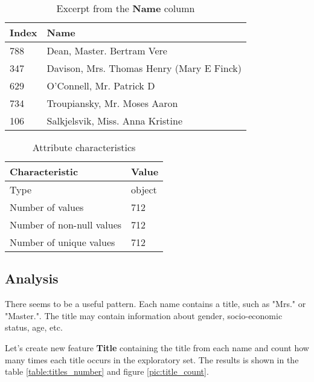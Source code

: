 \begin{table}[!hp]
    \centering
    \caption{Excerpt from the \textbf{Name} column}
    \begin{tabular}{|l|l|}
        \hline
        \textbf{Index} & \textbf{Name}                             \\ \hline
        788            & Dean, Master. Bertram Vere                \\ \hline
        347            & Davison, Mrs. Thomas Henry (Mary E Finck) \\ \hline
        629            & O'Connell, Mr. Patrick D                  \\ \hline
        734            & Troupiansky, Mr. Moses Aaron              \\ \hline
        106            & Salkjelsvik, Miss. Anna Kristine          \\ \hline
    \end{tabular}
    \label{table:name_column_excerpt}
\end{table}

\begin{table}[!hp]
    \centering
    \caption{Attribute characteristics}
    \begin{tabular}{|l|l|}
        \hline
        \textbf{Characteristic}   & \textbf{Value} \\ \hline
        Type                      & object         \\ \hline
        Number of values          & 712            \\ \hline
        Number of non-null values & 712            \\ \hline
        Number of unique values   & 712            \\ \hline
    \end{tabular}
    \label{table:name_characteristics}
\end{table}

\subsection{Analysis}
There seems to be a useful pattern. Each name contains a title, such as 
"Mrs." or "Master.". The title may contain information about gender, 
socio-economic status, age, etc. 

Let's create new feature \textbf{Title} containing the title from each 
name and count how many times each title occurs in the exploratory set. 
The results is shown in the table \ref{table:titles_number} and figure 
\ref{pic:title_count}.


